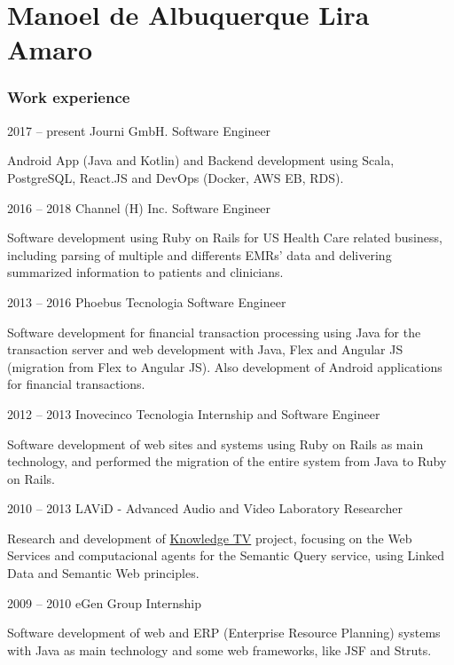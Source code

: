 \documentclass{tccv}
\begin{document}
\part{Manoel de Albuquerque Lira Amaro}

\section{Work experience}

\begin{eventlist}

\item{2017 -- present}
     {Journi GmbH.}
     {Software Engineer}

Android App (Java and Kotlin) and Backend development using Scala, PostgreSQL, React.JS and DevOps (Docker, AWS EB, RDS).

\item{2016 -- 2018}
     {Channel (H) Inc.}
     {Software Engineer}

Software development using Ruby on Rails for US Health Care related business, including parsing of multiple and differents EMRs' data and delivering summarized information to patients and clinicians.

\item{2013 -- 2016}
     {Phoebus Tecnologia}
     {Software Engineer}

Software development for financial transaction processing using Java for the transaction server and web development with Java, Flex and Angular JS (migration from Flex to Angular JS). Also development of Android applications for financial transactions.

\item{2012 -- 2013}
     {Inovecinco Tecnologia}
     {Internship and Software Engineer}

Software development of web sites and systems using Ruby on Rails as main technology, and performed the migration of the entire system from Java to Ruby on Rails.

\item{2010 -- 2013}
     {LAViD - Advanced Audio and Video Laboratory}
     {Researcher}

Research and development of \href{http://knowledgetv.lavid.ufpb.br/}{Knowledge TV} project,
focusing on the Web Services and computacional agents for the Semantic Query service, using Linked Data and Semantic Web principles.

\item{2009 -- 2010}
     {eGen Group}
     {Internship}

Software development of web and ERP (Enterprise Resource Planning) systems with Java as main technology and some web frameworks, like JSF and Struts.

\end{eventlist}
\end{document}
